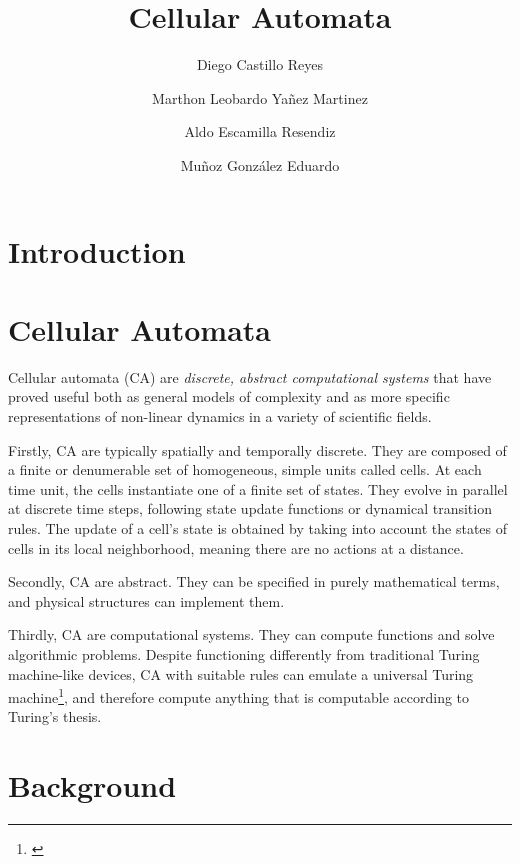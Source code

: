 \documentclass[9pt,a4paper,twoside]{tau-class/tau}
\title{Cellular Automata}
\author[a]{Diego Castillo Reyes}
\author[a]{Marthon Leobardo Yañez Martinez}
\author[a]{Aldo Escamilla Resendiz}
\author[a]{Muñoz González Eduardo}
\affil[a]{Researcher}
\begin{document}
		
    \maketitle 
    \thispagestyle{firststyle} \tauabstract
    \tableofcontents

\section{Introduction}

    \section{Cellular Automata}

    Cellular automata (CA) are \textit{discrete, abstract computational systems} that have proved useful both as general models of complexity and as more specific representations of non-linear dynamics in a variety of scientific fields. 

    Firstly, CA are typically spatially and temporally discrete. They are composed of a finite or denumerable set of homogeneous, simple units called cells. At each time unit, the cells instantiate one of a finite set of states. 
    They evolve in parallel at discrete time steps, following state update functions or dynamical transition rules. 
    The update of a cell's state is obtained by taking into account the states of cells in its local neighborhood, meaning there are no actions at a distance.

    Secondly, CA are abstract. They can be specified in purely mathematical terms, and physical structures can implement them.

    Thirdly, CA are computational systems. They can compute functions and solve algorithmic problems. Despite functioning differently from traditional 
    Turing machine-like devices, CA with suitable rules can emulate a universal Turing machine\footnote{\cite[Read more at:  "Turing Machines", The Stanford Encyclopedia of Philosophy (Winter 2021 Edition), Edward N. Zalta (ed.), URL = <https://plato.stanford.edu/archives/win2021/entries/turing-machine/>.]{sep-touring-machine}}, 
    and therefore compute anything that is computable according to Turing's thesis.\cite{sep-cellular-automata}


\section{Background}
\end{document}
